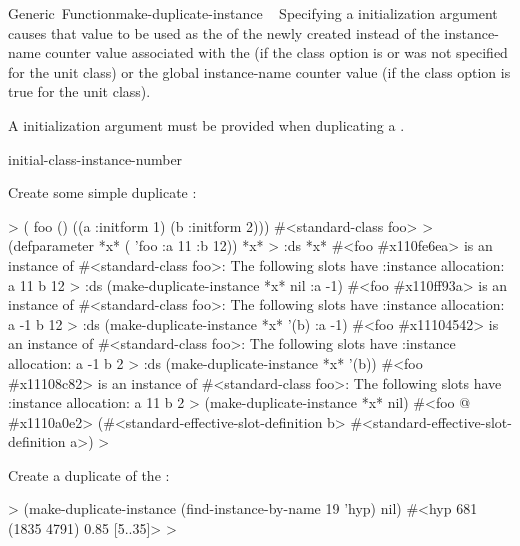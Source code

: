 \documentclass[10pt,twoside,english,pdftex]{article}
\begin{document}
\begin{functiondoc}{Generic~Function}{make-duplicate-instance}{%
     
     
    \mbox{\returns{} }}
Specifying a  initialization argument
causes that value to be used as the  of the newly created
 instead of the instance-name counter value associated
with the  (if
the  class option is \nil{} or was not
specified for the unit class) or the global instance-name counter value (if
the  class option is true for the unit
class).

A  initialization argument must be provided when
duplicating a .

\begin{alsos}{initial-class-instance-number}
\end{alsos}

\fnexamples
Create some simple duplicate :
%
%
%
%
\W\supp
\begin{example}
  > ( foo () 
       ((a :initform 1)
        (b :initform 2)))
  #<standard-class foo>
  > (defparameter *x* ( 'foo :a 11 :b 12))
  *x*
  > :ds *x*
  #<foo #x110fe6ea> is an instance of #<standard-class foo>:
   The following slots have :instance allocation:
    a   11
    b   12
  > :ds (make-duplicate-instance *x* nil :a -1)
  #<foo #x110ff93a> is an instance of #<standard-class foo>:
   The following slots have :instance allocation:
    a   -1
    b   12\goodpagebreak
  > :ds (make-duplicate-instance *x* '(b) :a -1)
  #<foo #x11104542> is an instance of #<standard-class foo>:
   The following slots have :instance allocation:
    a   -1
    b   2
  > :ds (make-duplicate-instance *x* '(b))
  #<foo #x11108c82> is an instance of #<standard-class foo>:
   The following slots have :instance allocation:
    a   11
    b   2
  > (make-duplicate-instance *x* nil)
  #<foo @ #x1110a0e2>
  (#<standard-effective-slot-definition b>
   #<standard-effective-slot-definition a>)
  >
\end{example}

Create a duplicate of the   :
%
\W\supp
\begin{example}
  > (make-duplicate-instance (find-instance-by-name 19 'hyp) nil)
  #<hyp 681 (1835 4791) 0.85 [5..35]>
  >
\end{example}

\end{functiondoc}
\end{document}
